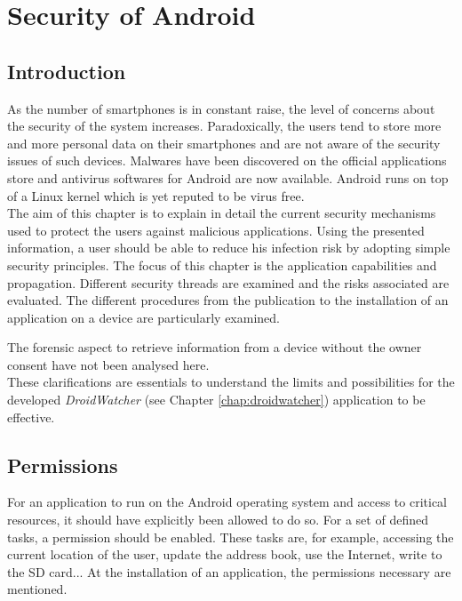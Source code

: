 \chapter{Security of Android}
\label{chap:and-secu}

\section*{Introduction}
As the number of smartphones is in constant raise, the level of concerns about the security of the system increases.
Paradoxically, the users tend to store more and more personal data on their smartphones and are not aware of the security issues of such devices.
Malwares have been discovered on the official applications store and antivirus softwares for Android are now available.
Android runs on top of a Linux kernel which is yet reputed to be virus free.\\

The aim of this chapter is to explain in detail the current security mechanisms used to protect the users against malicious applications.
Using the presented information, a user should be able to reduce his infection risk by adopting simple security principles.
The focus of this chapter is the application capabilities and propagation.
Different security threads are examined and the risks associated are evaluated.
The different procedures from the publication to the installation of an application on a device are particularly examined.

The forensic aspect to retrieve information from a device without the owner consent have not been analysed here.\\

These clarifications are essentials to understand the limits and possibilities for the developed \emph{DroidWatcher} (see Chapter \ref{chap:droidwatcher}) application to be effective.

\section{Permissions}
\label{sec:permissions}

For an application to run on the Android operating system and access to critical resources, it should have explicitly been allowed to do so.
For a set of defined tasks, a permission should be enabled.
These tasks are, for example, accessing the current location of the user, update the address book, use the Internet, write to the SD card...
At the installation of an application, the permissions necessary are mentioned.\\

